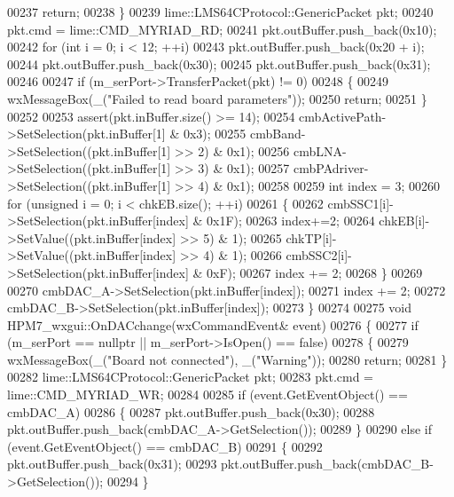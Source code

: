 \begin{DoxyCode}
{{{00237         \textcolor{keywordflow}{return};
00238     \}
00239     lime::LMS64CProtocol::GenericPacket pkt;
00240     pkt.cmd = lime::CMD_MYRIAD_RD;
00241     pkt.outBuffer.push\_back(0x10);
00242     \textcolor{keywordflow}{for} (\textcolor{keywordtype}{int} i = 0; i < 12; ++i)
00243         pkt.outBuffer.push\_back(0x20 + i);
00244     pkt.outBuffer.push\_back(0x30);
00245     pkt.outBuffer.push\_back(0x31);
00246 
00247     \textcolor{keywordflow}{if} (m_serPort->TransferPacket(pkt) != 0)
00248     \{
00249         wxMessageBox(\_(\textcolor{stringliteral}{"Failed to read board parameters"}));
00250         \textcolor{keywordflow}{return};
00251     \}
00252 
00253     assert(pkt.inBuffer.size() >= 14);
00254     cmbActivePath->SetSelection(pkt.inBuffer[1] & 0x3);
00255     cmbBand->SetSelection((pkt.inBuffer[1] >> 2) & 0x1);
00256     cmbLNA->SetSelection((pkt.inBuffer[1] >> 3) & 0x1);
00257     cmbPAdriver->SetSelection((pkt.inBuffer[1] >> 4) & 0x1);
00258 
00259     \textcolor{keywordtype}{int} index = 3;
00260     \textcolor{keywordflow}{for} (\textcolor{keywordtype}{unsigned} i = 0; i < chkEB.size(); ++i)
00261     \{
00262         cmbSSC1[i]->SetSelection(pkt.inBuffer[index] & 0x1F);
00263         index+=2;
00264         chkEB[i]->SetValue((pkt.inBuffer[index] >> 5) & 1);
00265         chkTP[i]->SetValue((pkt.inBuffer[index] >> 4) & 1);
00266         cmbSSC2[i]->SetSelection(pkt.inBuffer[index] & 0xF);
00267         index += 2;
00268     \}
00269 
00270     cmbDAC_A->SetSelection(pkt.inBuffer[index]);
00271     index += 2;
00272 cmbDAC_B->SetSelection(pkt.inBuffer[index]);
00273 \}
00274 
00275 \textcolor{keywordtype}{void} HPM7_wxgui::OnDACchange(wxCommandEvent& event)
00276 \{
00277     \textcolor{keywordflow}{if} (m_serPort == \textcolor{keyword}{nullptr} || m_serPort->IsOpen() == \textcolor{keyword}{false})
00278     \{
00279         wxMessageBox(\_(\textcolor{stringliteral}{"Board not connected"}), \_(\textcolor{stringliteral}{"Warning"}));
00280         \textcolor{keywordflow}{return};
00281     \}
00282     lime::LMS64CProtocol::GenericPacket pkt;
00283     pkt.cmd = lime::CMD_MYRIAD_WR;
00284 
00285     \textcolor{keywordflow}{if} (event.GetEventObject() == cmbDAC_A)
00286     \{
00287         pkt.outBuffer.push\_back(0x30);
00288         pkt.outBuffer.push\_back(cmbDAC_A->GetSelection());
00289     \}
00290     \textcolor{keywordflow}{else} \textcolor{keywordflow}{if} (event.GetEventObject() == cmbDAC_B)
00291     \{
00292         pkt.outBuffer.push\_back(0x31);
00293         pkt.outBuffer.push\_back(cmbDAC_B->GetSelection());
00294     \}
}}}
\end{DoxyCode}
